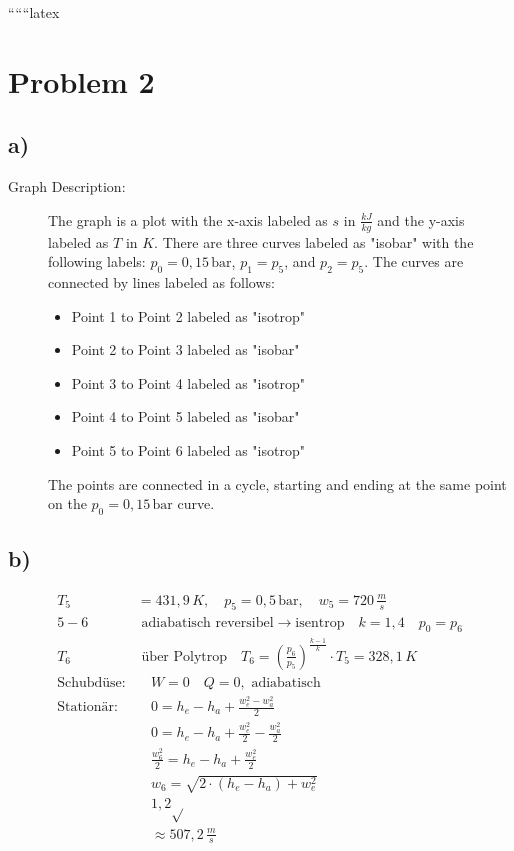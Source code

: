 
``````latex


\section*{Problem 2}

\subsection*{a)}

\begin{description}
    \item[Graph Description:] The graph is a plot with the x-axis labeled as $s$ in $\frac{kJ}{kg}$ and the y-axis labeled as $T$ in $K$. There are three curves labeled as "isobar" with the following labels: $p_0 = 0,15 \, \text{bar}$, $p_1 = p_5$, and $p_2 = p_5$. The curves are connected by lines labeled as follows:
    \begin{itemize}
        \item Point 1 to Point 2 labeled as "isotrop"
        \item Point 2 to Point 3 labeled as "isobar"
        \item Point 3 to Point 4 labeled as "isotrop"
        \item Point 4 to Point 5 labeled as "isobar"
        \item Point 5 to Point 6 labeled as "isotrop"
    \end{itemize}
    The points are connected in a cycle, starting and ending at the same point on the $p_0 = 0,15 \, \text{bar}$ curve.
\end{description}

\subsection*{b)}

\begin{align*}
    T_5 &= 431,9 \, K, \quad p_5 = 0,5 \, \text{bar}, \quad w_5 = 720 \, \frac{m}{s} \\
    5-6 &\text{ adiabatisch reversibel} \rightarrow \text{isentrop} \quad k = 1,4 \quad p_0 = p_6 \\
    T_6 &\text{ über Polytrop} \quad T_6 = \left( \frac{p_6}{p_5} \right)^{\frac{k-1}{k}} \cdot T_5 = 328,1 \, K \\
    \text{Schubdüse:} &\quad W = 0 \quad Q = 0, \text{ adiabatisch} \\
    \text{Stationär:} &\quad 0 = h_e - h_a + \frac{w_e^2 - w_a^2}{2} \\
    &\quad 0 = h_e - h_a + \frac{w_e^2}{2} - \frac{w_a^2}{2} \\
    &\quad \frac{w_6^2}{2} = h_e - h_a + \frac{w_e^2}{2} \\
    &\quad w_6 = \sqrt{2 \cdot (h_e - h_a) + w_e^2} \\
    &\quad 1,2 \sqrt{} \\
    &\quad \approx 507,2 \, \frac{m}{s}
\end{align*}

